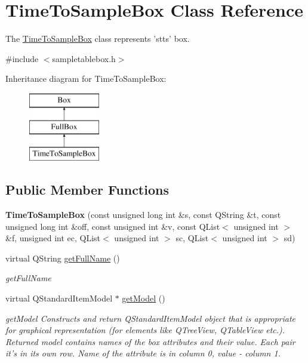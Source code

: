 \hypertarget{class_time_to_sample_box}{\section{Time\-To\-Sample\-Box Class Reference}
\label{class_time_to_sample_box}
}


The \hyperlink{class_time_to_sample_box}{Time\-To\-Sample\-Box} class represents 'stts' box.  




{\ttfamily \#include $<$sampletablebox.\-h$>$}

Inheritance diagram for Time\-To\-Sample\-Box\-:\begin{figure}[H]
\begin{center}
\leavevmode
\includegraphics[height=3.000000cm]{class_time_to_sample_box}
\end{center}
\end{figure}
\subsection*{Public Member Functions}
\begin{DoxyCompactItemize}
\item 
\hypertarget{class_time_to_sample_box_a18c4138ab2bcc5808c2c7a08f9da097a}{{\bfseries Time\-To\-Sample\-Box} (const unsigned long int \&s, const Q\-String \&t, const unsigned long int \&off, const unsigned int \&v, const Q\-List$<$ unsigned int $>$ \&f, unsigned int ec, Q\-List$<$ unsigned int $>$ sc, Q\-List$<$ unsigned int $>$ sd)}\label{class_time_to_sample_box_a18c4138ab2bcc5808c2c7a08f9da097a}

\item 
virtual Q\-String \hyperlink{class_time_to_sample_box_a44c8086a9f61fb72f9549e8f997be7b9}{get\-Full\-Name} ()
\begin{DoxyCompactList}\small\item\em get\-Full\-Name \end{DoxyCompactList}\item 
virtual Q\-Standard\-Item\-Model $\ast$ \hyperlink{class_time_to_sample_box_a28661d2be357ba4eb02e98c5026b619d}{get\-Model} ()
\begin{DoxyCompactList}\small\item\em get\-Model Constructs and return Q\-Standard\-Item\-Model object that is appropriate for graphical representation (for elements like Q\-Tree\-View, Q\-Table\-View etc.). Returned model contains names of the box attributes and their value. Each pair it's in its own row. Name of the attribute is in column 0, value -\/ column 1. \end{DoxyCompactList}\end{DoxyCompactItemize}
